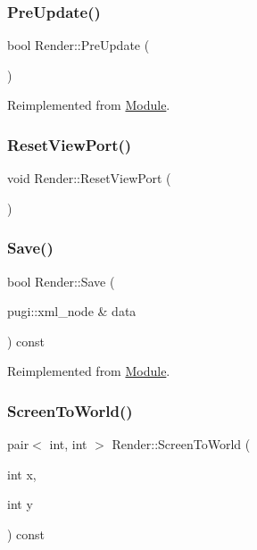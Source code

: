 \subsubsection{\texorpdfstring{PreUpdate()}{PreUpdate()}}
{\footnotesize\ttfamily bool Render\+::\+Pre\+Update (\begin{DoxyParamCaption}{ }\end{DoxyParamCaption})\hspace{0.3cm}{\ttfamily [virtual]}}



Reimplemented from \mbox{\hyperlink{class_module_a2c64af5917825500cf6f0497258bc398}{Module}}.

\mbox{\label{class_render_a7bba546f8cb8ecc2b29b9d57f99fb121}} 
\subsubsection{\texorpdfstring{ResetViewPort()}{ResetViewPort()}}
{\footnotesize\ttfamily void Render\+::\+Reset\+View\+Port (\begin{DoxyParamCaption}{ }\end{DoxyParamCaption})}

\mbox{\label{class_render_a8a7339d22cc1019c02dd4778f4f36593}} 
\subsubsection{\texorpdfstring{Save()}{Save()}}
{\footnotesize\ttfamily bool Render\+::\+Save (\begin{DoxyParamCaption}\item[{pugi\+::xml\+\_\+node \&}]{data }\end{DoxyParamCaption}) const\hspace{0.3cm}{\ttfamily [virtual]}}



Reimplemented from \mbox{\hyperlink{class_module_aae4bfdba7949d0f94bd8073b3a27dc3d}{Module}}.

\mbox{\label{class_render_a4ff43172da50d9d5f706b432dca80900}} 
\subsubsection{\texorpdfstring{ScreenToWorld()}{ScreenToWorld()}}
{\footnotesize\ttfamily pair$<$ int, int $>$ Render\+::\+Screen\+To\+World (\begin{DoxyParamCaption}\item[{int}]{x,  }\item[{int}]{y }\end{DoxyParamCaption}) const}


